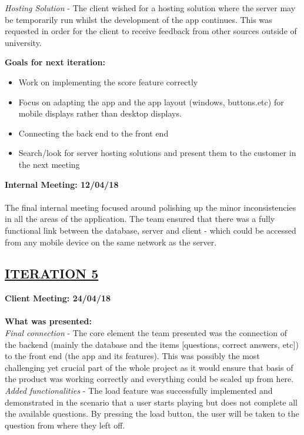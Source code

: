 \documentclass[paper=a4,fontsize=11pt]{article}
\newcommand{\sepspace}{\vspace*{1em}}		%
\newcommand{\SectionPart}[1]{\subsection*{\uppercase{#1}}}
\begin{document}
\noindent
\textit{Hosting Solution} -
The client wished for a hosting solution where the server may be temporarily run whilst the
development of the app continues. This was requested in order for the client to receive feedback
from other sources outside of university.\\
\sepspace

\noindent
\textbf{Goals for next iteration:}
\begin{itemize}
	\item Work on implementing the score feature correctly
	\item Focus on adapting the app and the app layout (windows, buttons.etc) for mobile displays rather than desktop displays.
	\item Connecting the back end to the front end
	\item Search/look for server hosting solutions and present them to the customer in the next meeting
\end{itemize}
\sepspace

\hfill \textbf{Internal Meeting: 12/04/18}\\
\\
\noindent
The final internal meeting focused around polishing up the minor inconsistencies in all the
areas of the application. The team ensured that there was a fully functional link between
the database, server and client - which could be accessed from any mobile device on the same network
as the server.\\
\sepspace

\SectionPart{\ul{Iteration 5}}
\hfill \textbf{Client Meeting: 24/04/18} \\
\\
\textbf{What was presented:}\\
\noindent
\textit{Final connection} -
The core element the team presented was the connection of the backend (mainly the database
and the items [questions, correct answers, etc]) to the front end (the app and its features).
This was possibly the most challenging yet crucial part of the whole project as it would
ensure that basis of the product was working correctly and everything could be scaled up from here.\\

\noindent
\textit{Added functionalities} -
The load feature was successfully implemented and demonstrated in the scenario that a user
starts playing but does not complete all the available questions. By pressing the load button,
the user will be taken to the question from where they left off.\\
\sepspace
\end{document}
